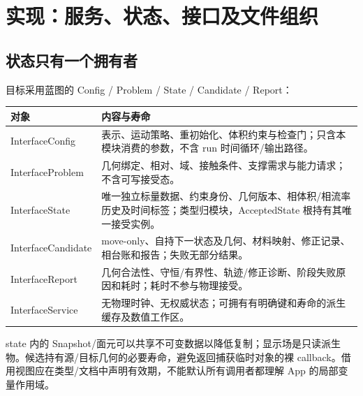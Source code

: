 \documentclass[UTF8,a4paper,11pt,fontset=fandol]{ctexart}
\begin{document}
\section{实现：服务、状态、接口及文件组织}
\subsection{状态只有一个拥有者}
目标采用蓝图的 Config / Problem / State / Candidate / Report：
\begin{longtable}{@{}P{.21\textwidth}P{.73\textwidth}@{}}
\toprule 对象 & 内容与寿命\\\midrule\endhead
InterfaceConfig & 表示、运动策略、重初始化、体积约束与检查门；只含本模块消费的参数，不含 run 时间循环/输出路径。\\
InterfaceProblem & 几何绑定、相对、域、接触条件、支撑需求与能力请求；不含可写接受态。\\
InterfaceState & 唯一独立标量数据、约束身份、几何版本、相体积/相流率历史及时间标签；类型归模块，AcceptedState 根持有其唯一接受实例。\\
InterfaceCandidate & move-only、自持下一状态及几何、材料映射、修正记录、相台账和报告；失败无部分结果。\\
InterfaceReport & 几何合法性、守恒/有界性、轨迹/修正诊断、阶段失败原因和耗时；耗时不参与物理接受。\\
InterfaceService & 无物理时钟、无权威状态；可拥有有明确键和寿命的派生缓存及数值工作区。\\
\bottomrule
\end{longtable}
state 内的 Snapshot/面元可以共享不可变数据以降低复制；显示场是只读派生物。候选持有源/目标几何的必要寿命，避免返回捕获临时对象的裸 callback。借用视图应在类型/文档中声明有效期，不能默认所有调用者都理解 App 的局部变量作用域。
\end{document}
